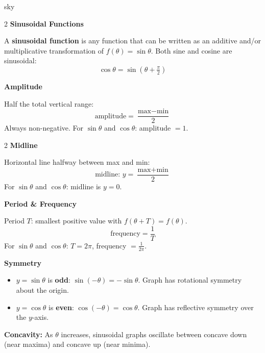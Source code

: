 \documentclass[10pt]{article}
\begin{document}
\begin{skillbox}[Lesson]{sky}
  \begin{multicols}{2}
  \textbf{Sinusoidal Functions}

  A \textbf{sinusoidal function} is any function that can be written as an
  additive and/or multiplicative transformation of $f(\theta)=\sin\theta$.
  Both sine and cosine are sinusoidal:
  \[
    \cos\theta = \sin\!\left(\theta + \tfrac{\pi}{2}\right)
  \]

  \columnbreak

  \textbf{Amplitude}

  Half the total vertical range:
  \[
    \text{amplitude} = \frac{\text{max} - \text{min}}{2}
  \]
  Always non-negative.  For $\sin\theta$ and $\cos\theta$: amplitude $=1$.
  \end{multicols}

  \begin{multicols}{2}
  \textbf{Midline}

  Horizontal line halfway between max and min:
  \[
    \text{midline: } y = \frac{\text{max} + \text{min}}{2}
  \]
  For $\sin\theta$ and $\cos\theta$: midline is $y=0$.

  \columnbreak

  \textbf{Period \& Frequency}

  Period $T$: smallest positive value with $f(\theta+T)=f(\theta)$.
  \[
    \text{frequency} = \frac{1}{T}
  \]
  For $\sin\theta$ and $\cos\theta$: $T=2\pi$, frequency $=\tfrac{1}{2\pi}$.
  \end{multicols}

  \textbf{Symmetry}
  \begin{itemize}
    \item $y=\sin\theta$ is \textbf{odd}: $\sin(-\theta)=-\sin\theta$.
          Graph has rotational symmetry about the origin.
    \item $y=\cos\theta$ is \textbf{even}: $\cos(-\theta)=\cos\theta$.
          Graph has reflective symmetry over the $y$-axis.
  \end{itemize}

  \textbf{Concavity:} As $\theta$ increases, sinusoidal graphs oscillate between
  concave down (near maxima) and concave up (near minima).
\end{skillbox}
\end{document}
